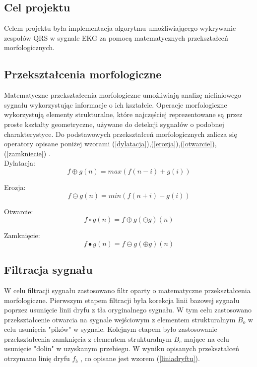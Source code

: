 \documentclass[10pt,a4paper]{article}
\begin{document}
\subsection{Cel projektu}

Celem projektu była implementacja algorytmu umożliwiającego wykrywanie zespołów QRS w sygnale EKG za pomocą matematycznych przekształceń morfologicznych.

\subsection{Przekształcenia morfologiczne}

Matematyczne przekształcenia morfologiczne umożliwiają analizę nieliniowego sygnału wykorzystując informacje o ich kształcie. Operacje morfologiczne wykorzystują elementy strukturalne, które najczęściej reprezentowane są przez proste kształty geometryczne, używane do detekcji sygnałów o podobnej charakterystyce. Do podstawowych przekształceń morfologicznych zalicza się operatory opisane poniżej wzorami (\ref{dylatacja}),(\ref{erozja}),(\ref{otwarcie}),(\ref{zamkniecie}) \cite{adaptiveMM}.\\

Dylatacja:
\begin{equation} 
f \oplus g(n) = max(f(n-i) + g(i))
\label{dylatacja}
\end{equation}

Erozja:
\begin{equation} 
f \ominus g(n) = min(f(n+i) - g(i))
\label{erozja}
\end{equation}

Otwarcie:
\begin{equation} 
f \circ g(n) = f \oplus g( \ominus g)(n)
\label{otwarcie}
\end{equation}

Zamknięcie:
\begin{equation} 
f \bullet g(n) = f \ominus g( \oplus g)(n)
\label{zamkniecie}
\end{equation}


\subsection{Filtracja sygnału}

W celu filtracji sygnału zastosowano filtr oparty o matematyczne przekształcenia morfologiczne. Pierwszym etapem filtracji była korekcja linii bazowej sygnału poprzez usunięcie linii dryfu z tła oryginalnego sygnału. W tym celu zastosowano przekształcenie otwarcia na sygnale wejściowym z elementem strukturalnym $B_o$ w celu usunięcia "pików" w sygnale. Kolejnym etapem było zastosowanie przekształcenia zamknięcia z elementem strukturalnym $B_c$ mające na celu usunięcie "dolin" w uzyskanym przebiegu. W wyniku opisanych przekształceń otrzymano linię dryfu $f_b$   , co opisane jest wzorem (\ref{liniadryftu}).
\end{document}
